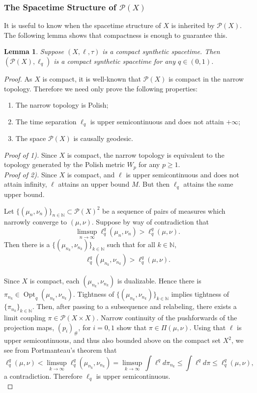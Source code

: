 \documentclass{article}
\newcommand{\N}{\mathbb{N}}
\newcommand{\Pcal}{\mathcal{P}}
\DeclareMathOperator{\Opt}{Opt}
\newtheorem{lemma}[theorem]{Lemma}
\theoremstyle{definition}
\begin{document}
{\subsubsection{The Spacetime Structure of $\Pcal(X)$}
It is useful to know when the spacetime structure of $X$ is inherited by $\Pcal(X)$. The following lemma shows that compactness is enough to guarantee this. 

\begin{lemma}\label{spacetimestructure}
Suppose $(X, \ell, \tau) $ is a compact synthetic spacetime. Then $(\Pcal(X), \ell_q)$ is a compact synthetic spacetime for any $q\in(0,1)$.
\end{lemma}
\begin{proof}
As $X$ is compact, it is well-known that $\Pcal(X)$ is compact in the narrow topology. Therefore we need only prove the following properties: 
\begin{enumerate}
\item The narrow topology is Polish;
\item The time separation $\ell_q$ is upper semicontinuous and does not attain $+\infty$; 
\item The space $\Pcal(X)$ is causally geodesic.
\end{enumerate}

{\it  Proof of 1).} Since $X$ is compact, the narrow topology is equivalent to the topology generated by the Polish metric $W_p$ for any $p\geq 1$. \\

{\it Proof of 2).} Since $X$ is compact, and $\ell$ is upper semicontinuous and does not attain infinity, $\ell$ attains an upper bound $M$. But then $\ell_q$ attains the same upper bound. 

Let $\{(\mu_n, \nu_n)\}_{n\in\N}\subset \Pcal(X)^2$ be a sequence of pairs of measures which narrowly converge to $(\mu,\nu)$.  Suppose by way of contradiction that 
\[\limsup_{n\to\infty}\ell_q^q(\mu_n,\nu_n) >\ell_q^q(\mu,\nu).\]
Then there is a $\{(\mu_{n_k}, \nu_{n_k})\}_{k\in\N}$ such that for all $k\in\N$, 
\begin{align*}
\ell_q^q(\mu_{n_k},\nu_{n_k})> \ell_q^q(\mu,\nu).
\end{align*}

Since $X$ is compact, each $(\mu_{n_k},\nu_{n_k})$ is dualizable. Hence there is $\pi_{n_k}\in \Opt_q(\mu_{n_k},\nu_{n_k})$. Tightness of $\{(\mu_{n_k}, \nu_{n_k})\}_{k\in\N}$ implies tightness of $\{\pi_{n_k}\}_{k\in\N}$.
Then, after passing to a subsequence and relabeling, there exists a limit coupling $\pi\in\Pcal(X\times X)$. Narrow continuity of the pushforwards of the projection maps, $(p_i)_\#$, for $i=0,1$ show that $\pi\in \Pi(\mu,\nu)$. Using that $\ell$ is upper semicontinuous, and thus also bounded above on the compact set $X^2$, we see from Portmanteau's theorem that 
\[\ell_q^q(\mu,\nu)< \limsup_{k\to\infty} \ell_q^q(\mu_{n_k}, \nu_{n_k})=\limsup_{k\to\infty}\int \ell^q d\pi_{n_k}\leq \int \ell^q d\pi \leq \ell_q^q(\mu,\nu), \]
a contradiction. Therefore $\ell_q$ is upper semicontinuous.\\


\end{proof}}
\end{document}
